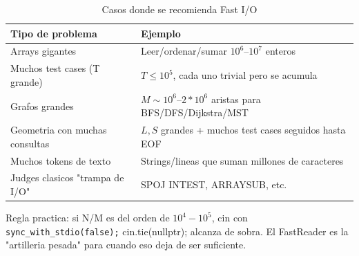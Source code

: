 \documentclass[10pt,a4paper,twocolumn]{article}
\begin{document}
\begin{table}[h]
\centering
\caption{Casos donde se recomienda Fast I/O}
\begin{tabular}{|p{}|p{}|}
\hline
\textbf{Tipo de problema} & \textbf{Ejemplo} \\
\hline
Arrays gigantes & Leer/ordenar/sumar $10^6$--$10^7$ enteros \\
\hline
Muchos test cases (T grande) & $T \leq 10^5$, cada uno trivial pero se acumula \\
\hline
Grafos grandes & $M \sim 10^6$--$2*10^6$ aristas para BFS/DFS/Dijkstra/MST \\
\hline
Geometria con muchas consultas & $L,S$ grandes + muchos test cases seguidos hasta EOF \\
\hline
Muchos tokens de texto & Strings/lineas que suman millones de caracteres \\
\hline
Judges clasicos "trampa de I/O" & SPOJ INTEST, ARRAYSUB, etc. \\
\hline
\end{tabular}
\end{table}

Regla practica: si N/M es del orden de $10^4-10^5$, cin con
\texttt{sync\_with\_stdio(false);} cin.tie(nullptr); alcanza de sobra. El FastReader
es la "artilleria pesada" para cuando eso deja de ser suficiente.
\end{document}
